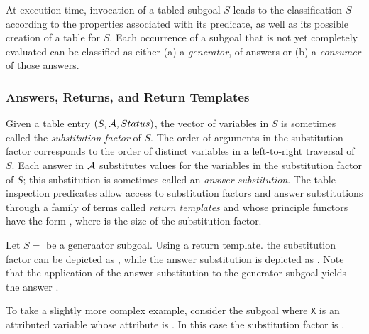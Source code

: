 At execution time, invocation of a tabled subgoal $S$ leads to the
classification $S$ according to the properties associated with its
predicate, as well as its possible creation of a table for $S$.  Each
occurrence of a subgoal that is not yet completely evaluated can be
classified as either (a) a \emph{generator}, of answers or (b) a
\emph{consumer} of those answers. 




\subsubsection*{Answers, Returns, and Return Templates}

%
Given a table entry $(S,{\cal A},Status)$, the vector of variables in $S$ is
sometimes called the {\em substitution factor} of $S$.  The order of
arguments in the substitution factor corresponds to the order of
distinct variables in a left-to-right traversal of $S$.  Each answer
in ${\cal A}$ substitutes values for the variables in the substitution
factor of $S$; this substitution is sometimes called an {\em answer
  substitution}.  The table inspection predicates allow access to
substitution factors and answer substitutions through a family of
terms called {\em return templates} and whose principle functors have
the form \retn, where  is the size of the substitution factor.

\begin{example}
Let $S =$  be a generaator subgoal.  Using a return
template. the substitution factor can be depicted as ,
while the answer substitution  is depicted as
.  Note that the application of the answer substitution
to the generator subgoal yields the answer .

To take a slightly more complex example, consider the subgoal
 where {\tt X} is an attributed variable whose attribute is
.  In this case the substitution factor is
.\fillBox
\end{example}

